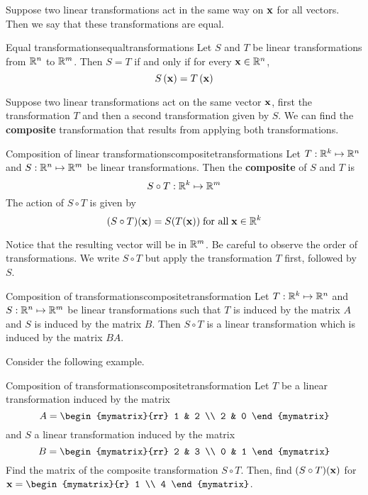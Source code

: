 Suppose two linear transformations act in the same way on ${\bf x}$ for all vectors. Then we say that these transformations are equal.

\begin{definition}{Equal transformations}{equaltransformations}
Let $S$ and $T$ be linear transformations from $\mathbb{R}^n$ to $\mathbb{R}^m$. Then $S = T$ if and only if for every ${\bf x} \in \mathbb{R}^n$, 
\[
S \left( {\bf x} \right) = T \left( {\bf x} \right)
\]
\end{definition}

Suppose two linear transformations act on the same vector ${\bf x}$, first the transformation $T$ and then a second transformation given by $S$. We can find the \textbf{composite} transformation that results from applying both transformations.

\begin{definition}{Composition of linear transformations}{compositetransformations}
Let $T: \mathbb{R}^k \mapsto \mathbb{R}^n$ and $S: \mathbb{R}^n \mapsto \mathbb{R}^m$ be linear transformations. Then the \textbf{composite} of $S$ and $T$ is 
\[
S \circ T: \mathbb{R}^k \mapsto \mathbb{R}^m
\]
The action of $S \circ T$ is given by 
\[
(S \circ T) ({\bf x}) = S(T({\bf x})) \; \mbox{for all} \; {\bf x} \in \mathbb{R}^k
\]
\end{definition}

Notice that the resulting vector will be in $\mathbb{R}^m$. Be careful to observe the order of transformations. We write $S \circ T$ but apply the transformation $T$ first, followed by $S$. 

\begin{theorem}{Composition of transformations}{compositetransformation}
Let $T: \mathbb{R}^k \mapsto \mathbb{R}^n$ and $S: \mathbb{R}^n \mapsto \mathbb{R}^m$ be linear transformations such that $T$ is induced by the matrix $A$ and $S$ is induced by the matrix $B$. Then $S \circ T$ is a linear transformation which is induced by the matrix $BA$.
\end{theorem}

Consider the following example. 

\begin{example}{Composition of transformations}{compositetransformation}
Let $T$ be a linear transformation induced by the matrix 
\[
A = 
\begin{mymatrix}{rr}
1 & 2 \\
2 & 0 
\end{mymatrix}
\]
and $S$ a linear transformation induced by the matrix
\[
B = 
\begin{mymatrix}{rr}
2 & 3 \\
0 & 1
\end{mymatrix}
\]
Find the matrix of the composite transformation $S \circ T$. Then, find $(S \circ T)({\bf x})$ for $\vect{x} = \begin{mymatrix}{r}
1 \\
4 
\end{mymatrix}$.
\end{example}

